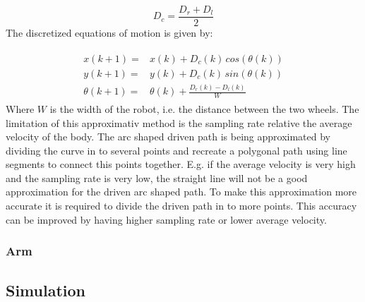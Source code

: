 \begin{equation}
    D_c = \frac{D_r + D_l}{2}
\end{equation}
The discretized equations of motion is given by:

\begin{eqnarray}
\begin{aligned}
    x(k+1) =& x(k) + D_c(k)\,cos(\theta(k))\\
    y(k+1) =& y(k) + D_c(k)\,sin(\theta(k))\\
    \theta(k+1) =& \theta(k) + \frac{D_r(k)-D_l(k)}{W}
\end{aligned}
\end{eqnarray}\label{eq:Disc_EOM}
Where $W$ is the width of the robot, i.e. the distance between the two wheels.
The limitation of this approximativ method is the sampling rate relative the average velocity of the body.
The arc shaped driven path is being approximated by dividing the curve in to several points and recreate a polygonal path using line segments to connect this points together.
E.g. if the average velocity is very high and the sampling rate is very low, the straight line will not be a good approximation for the driven arc shaped path.
To make this approximation more accurate it is required to divide the driven path in to more points.
This accuracy can be improved by having higher sampling rate or lower average velocity.

\subsubsection{Arm}

\subsection{Simulation}

